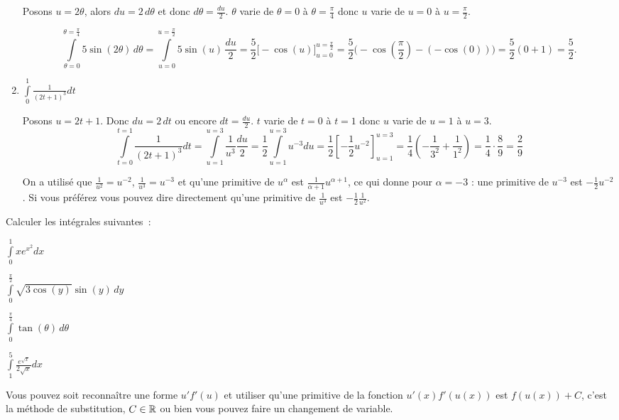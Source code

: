 \documentclass[11pt,class=report,crop=false]{standalone}
\begin{document}
\begin{enumerate}
   Posons $u = 2\theta$, alors $du = 2\,d\theta$ et donc $d\theta = \frac{du}{2}$.
   $\theta$ varie de $\theta=0$ à $\theta=\frac\pi4$ donc $u$ varie de $u=0$ à $u=\frac\pi2$.
   
   $$\int \limits _{\theta=0} ^{\theta=\frac{\pi}{4}} 5\sin(2\theta) \,d\theta
   = \int \limits _{u=0} ^{u=\frac{\pi}{2}} 5\sin(u) \,\frac{du}{2} 
   = \frac52 \big[-\cos(u) \big]_{u=0} ^{u=\frac{\pi}{2}} 
   = \frac52 \big( -\cos(\frac{\pi}{2}) - (-\cos(0)) \big)
   = \frac52 (0+1) = \frac52.$$
   
   \item $\int \limits _{0} ^{1} \frac{1}{(2t+1)^{3}} dt$   
 
   Posons $u = 2t+1$. Donc $du= 2 \,dt$ ou encore $dt = \frac{du}{2}$.
   $t$ varie de $t=0$ à $t=1$ donc $u$ varie de $u=1$ à $u=3$.
   $$\int \limits _{t=0} ^{t=1} \frac{1}{(2t+1)^{3}} dt
   = \int \limits _{u=1} ^{u=3} \frac{1}{u^{3}} \frac{du}{2}
   = \frac12 \int \limits _{u=1} ^{u=3} u^{-3} du
   = \frac12\left[ -\frac12u^{-2} \right]_{u=1} ^{u=3}
   = \frac14 \left( - \frac{1}{3^2} + \frac{1}{1^2} \right)
   = \frac14 \cdot \frac{8}{9}
   = \frac{2}{9}$$
   
   On a utilisé que $\frac{1}{u^2} = u^{-2}$, $\frac{1}{u^3} = u^{-3}$ et qu'une primitive de $u^\alpha$ est $\frac1{\alpha+1} u^{\alpha +1 }$, ce qui donne pour 
   $\alpha=-3$ : une primitive de  $u^{-3}$ est $-\frac12u^{-2}$.   
   Si vous préférez vous pouvez dire directement qu'une primitive de $\frac1{u^3}$ est $-\frac12\frac{1}{u^2}$.
    
\end{enumerate}
\fincorrection


\exercice{}
\enonce 
Calculer les intégrales suivantes~: 
\begin{examplescol}{2}
	\item $\int \limits _{0} ^{1} xe^{x^{2}}dx$
	\item $\int \limits _{0} ^{\frac{\pi}{2}} \sqrt{3\cos(y)}\sin{(y)} \,dy $ 
	\item $\int \limits _{0} ^{\frac{\pi}{4}} \tan(\theta) \,d\theta$
	\item $\int \limits _{1} ^{5} \frac{e^{\sqrt{x}}}{2\sqrt{x}}dx$
\end{examplescol}
\finenonce

\indication
Vous pouvez soit reconnaître une forme $u'f'(u)$ et utiliser qu'une primitive de la fonction $ u'(x) f'(u(x)) $ est $ f(u(x)) + C $, c'est la méthode de substitution, 
$ C \in \mathbb{R} $ ou bien vous pouvez faire un changement de variable. 
\finindication
\end{document}
